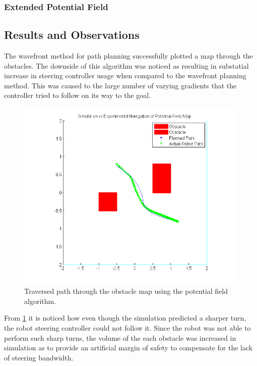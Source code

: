 \documentclass[11pt]{article} %
\begin{document}
\subsubsection{Extended Potential Field}

\subsection{Results and Observations}
The wavefront method for path planning successfully plotted a map through the obstacles.
The downside of this algorithm was noticed as resulting in substatial increase in steering controller usage
when compared to the wavefront planning method. This was caused to the large number of varying
gradients that the controller tried to follow on its way to the goal.

\begin{figure}[hbt]
 \centering
 \includegraphics[scale=0.80]{potentialFieldMapNavigation.png}
 \caption{Traversed path through the obstacle map using the potential field algorithm.}
 \label{potFieldMap}
\end{figure}

From \ref{potFieldMap} it is noticed how even though the simulation predicted a sharper turn, 
the robot steering controller could not follow it. Since the robot was not able to perform 
such sharp turns, the volume of the each obstacle was increased in simulation as to provide an artificial
margin of safety to compensate for the lack of steering bandwidth.
\end{document}
